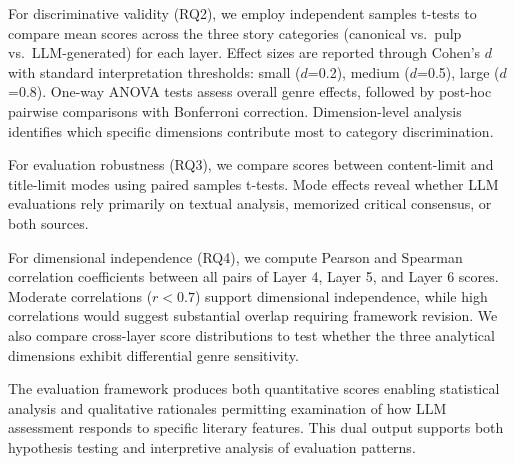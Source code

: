For discriminative validity (RQ2), we employ independent samples t-tests to compare mean scores across the three story categories (canonical vs.\ pulp vs.\ LLM-generated) for each layer. Effect sizes are reported through Cohen's $d$ with standard interpretation thresholds: small ($d$=0.2), medium ($d$=0.5), large ($d$=0.8). One-way ANOVA tests assess overall genre effects, followed by post-hoc pairwise comparisons with Bonferroni correction. Dimension-level analysis identifies which specific dimensions contribute most to category discrimination.

For evaluation robustness (RQ3), we compare scores between content-limit and title-limit modes using paired samples t-tests. Mode effects reveal whether LLM evaluations rely primarily on textual analysis, memorized critical consensus, or both sources.

For dimensional independence (RQ4), we compute Pearson and Spearman correlation coefficients between all pairs of Layer 4, Layer 5, and Layer 6 scores. Moderate correlations ($r < 0.7$) support dimensional independence, while high correlations would suggest substantial overlap requiring framework revision. We also compare cross-layer score distributions to test whether the three analytical dimensions exhibit differential genre sensitivity.

The evaluation framework produces both quantitative scores enabling statistical analysis and qualitative rationales permitting examination of how LLM assessment responds to specific literary features. This dual output supports both hypothesis testing and interpretive analysis of evaluation patterns.